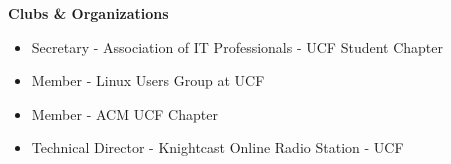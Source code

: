 \documentclass[10pt,oneside]{article}
\newenvironment{ressection}[1]{
	\vspace{4pt}
	\textbf{\selectfont\normalsize#1}
	\begin{itemize}
	\vspace{3pt}
}{
	\end{itemize}
}
\newcommand{\resitem}[1]{
	\vspace{-4pt}
	\item \begin{flushleft} #1 \end{flushleft}
}
\begin{document}

\begin{ressection}{Clubs \& Organizations}

	\resitem{Secretary - Association of IT Professionals - UCF Student Chapter}
	\resitem{Member - Linux Users Group at UCF}
	\resitem{Member - ACM UCF Chapter}
	\resitem{Technical Director - Knightcast Online Radio Station - UCF}

\end{ressection}

\end{document}
